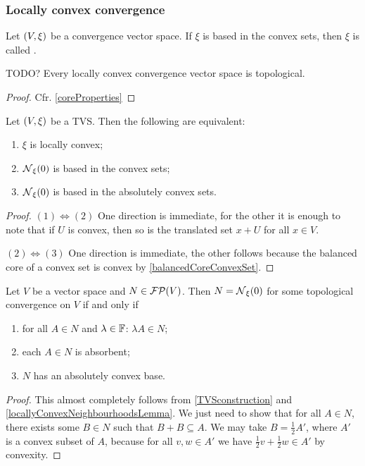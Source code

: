 \subsubsection{Locally convex convergence}
\begin{definition}
Let $\left( V,\xi \right)$ be a convergence vector space. If $\xi$ is based in the convex sets, then $\xi$ is called .
\end{definition}

\begin{lemma}
TODO? Every locally convex convergence vector space is topological.
\end{lemma}
\begin{proof}
Cfr. \ref{coreProperties}
\end{proof}

\begin{lemma} \label{locallyConvexNeighbourhoodsLemma}
Let $\left( V,\xi \right)$ be a TVS. Then the following are equivalent:
\begin{enumerate}
\item $\xi$ is locally convex;
\item $\operatorname{\mathcal{N}}_\xi(0)$ is based in the convex sets;
\item $\operatorname{\mathcal{N}}_\xi(0)$ is based in the absolutely convex sets.
\end{enumerate}
\end{lemma}
\begin{proof}
$(1) \Leftrightarrow (2)$ One direction is immediate, for the other it is enough to note that if $U$ is convex, then so is the translated set $x+U$ for all $x\in V$.

$(2) \Leftrightarrow (3)$ One direction is immediate, the other follows because the balanced core of a convex set is convex by \ref{balancedCoreConvexSet}.
\end{proof}

\begin{proposition}
Let $V$ be a vector space and $N\in\operatorname{\mathcal{FP}}(V)$. Then $N = \operatorname{\mathcal{N}}_\xi(0)$ for some topological convergence on $V$ \textup{if and only if}
\begin{enumerate}
\item for all $A\in N$ and $\lambda\in \mathbb{F}$: $\lambda A\in N$;
\item each $A \in N$ is absorbent;
\item $N$ has an absolutely convex base.
\end{enumerate}
\end{proposition}
\begin{proof}
This almost completely follows from \ref{TVSconstruction} and \ref{locallyConvexNeighbourhoodsLemma}. We just need to show that for all $A\in N$, there exists some $B\in N$ such that $B+B\subseteq A$. We may take $B = \frac{1}{2}A'$, where $A'$ is a convex subset of $A$, because for all $v,w\in A'$ we have $\frac{1}{2}v + \frac{1}{2}w \in A'$ by convexity.
\end{proof}


